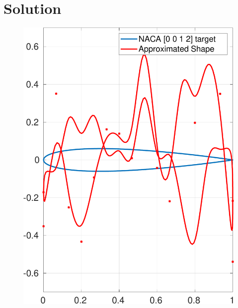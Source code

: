 \documentclass[paper=a4, fontsize=11pt]{scrartcl} %
\begin{document}
    \section{Solution}
    \begin{figure}[H]
        \centering
        \begin{minipage}{.5\textwidth}
            \centering
            \includegraphics[width=.95\linewidth]{a3-shapematch-0012-init}
            \label{fig:initial0012}
        \end{minipage}%
        \begin{minipage}{.5\textwidth}
            \centering

\end{minipage}
\end{figure}
\end{document}
